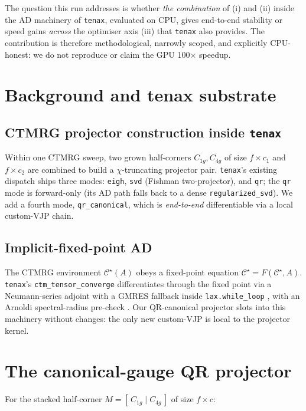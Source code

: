 \documentclass[aps,prresearch,reprint,amsmath,amssymb,floatfix]{revtex4-2}
\newcommand{\tenax}{\texttt{tenax}}
\newcommand{\code}[1]{\texttt{#1}}
\begin{document}
The question this run addresses is whether \emph{the combination} of (i)
and (ii) inside the AD machinery of \tenax{}, evaluated on CPU, gives
end-to-end stability or speed gains \emph{across} the optimiser axis (iii)
that \tenax{} also provides. The contribution is therefore methodological,
narrowly scoped, and explicitly CPU-honest: we do not reproduce or claim
the GPU 100$\times$ speedup.

\section{Background and tenax substrate}

\subsection{CTMRG projector construction inside \tenax}

Within one CTMRG sweep, two grown half-corners $C_{1g},C_{4g}$ of size
$f\times c_1$ and $f\times c_2$ are combined to build a $\chi$-truncating
projector pair. \tenax's existing dispatch \cite{TenaxRepo} ships three
modes: \code{eigh}, \code{svd} (Fishman two-projector), and \code{qr}; the
\code{qr} mode is forward-only (its AD path falls back to a dense
\code{regularized\_svd}). We add a fourth mode, \code{qr\_canonical},
which is \emph{end-to-end} differentiable via a local custom-VJP chain.

\subsection{Implicit-fixed-point AD}

The CTMRG environment $\mathcal{C}^\star(A)$ obeys a fixed-point equation
$\mathcal{C}^\star = F(\mathcal{C}^\star, A)$. \tenax{}'s
\code{ctm\_tensor\_converge} differentiates through the fixed point via a
Neumann-series adjoint with a GMRES fallback inside \code{lax.while\_loop}
\cite{TenaxRepo}, with an Arnoldi spectral-radius pre-check
\cite{Liao2019,Francuz2025}. Our QR-canonical projector slots into this
machinery without changes: the only new custom-VJP is local to the
projector kernel.

\section{The canonical-gauge QR projector}

For the stacked half-corner $M = [\,C_{1g}\;|\;C_{4g}\,]$ of size $f\times c$:
\end{document}
